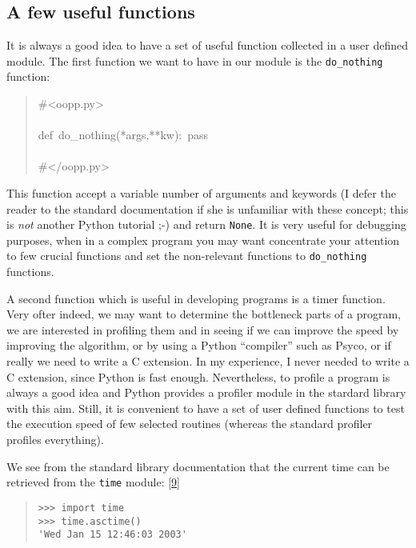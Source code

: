 \documentclass[10pt,english]{article}
\begin{document}

\hypertarget{a-few-useful-functions}{}
\subsection*{A few useful functions}

It is always a good idea to have a set of useful function collected in
a user defined module. The first function we want to have in our module
is the \texttt{do{\_}nothing} function:
\begin{quote}
\begin{ttfamily}\begin{flushleft}
\mbox{{\#}<oopp.py>}\\
\mbox{}\\
\mbox{def~do{\_}nothing(*args,**kw):~pass}\\
\mbox{}\\
\mbox{{\#}</oopp.py>}
\end{flushleft}\end{ttfamily}
\end{quote}

This function accept a variable number of arguments and keywords (I
defer the reader to the standard documentation if she is unfamiliar
with these concept; this is \emph{not} another Python tutorial ;-) and
return \texttt{None}. It is very useful for debugging purposes, when in a
complex program you may want concentrate your attention to few crucial
functions and set the non-relevant functions to \texttt{do{\_}nothing} functions.

A second function which is useful in developing programs is a timer
function. Very ofter indeed,  we may want to determine the bottleneck
parts of a program, we are interested in profiling them and in seeing 
if we can improve the speed by improving the algorithm, or by using
a Python ``compiler'' such as Psyco, or if really we need to write a C 
extension. In my experience, I never needed to write a C extension,
since Python is fast enough. Nevertheless, to profile a program is
always a good idea and Python provides a profiler module in the 
stardard library with this aim. Still, it is convenient to have
a set of user defined functions to test the execution speed of
few selected routines (whereas the standard profiler profiles everything).

We see from the standard library documentation that
the current time can be retrieved from the \texttt{time} module: [\hyperlink{id18}{9}]
\begin{quote}
\begin{verbatim}>>> import time
>>> time.asctime()
'Wed Jan 15 12:46:03 2003'\end{verbatim}
\end{quote}
\end{document}
